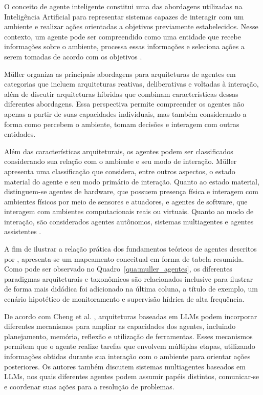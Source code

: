 O conceito de agente inteligente constitui uma das abordagens utilizadas na Inteligência Artificial para representar sistemas capazes de interagir com um ambiente e realizar ações orientadas a objetivos previamente estabelecidos. Nesse contexto, um agente pode ser compreendido como uma entidade que recebe informações sobre o ambiente, processa essas
informações e seleciona ações a serem tomadas de acordo com os objetivos \cite{muller1999}.

Müller \cite{muller1999} organiza as principais abordagens para arquiteturas de
agentes em categorias que incluem arquiteturas reativas, deliberativas e
voltadas à interação, além de discutir arquiteturas híbridas que combinam
características dessas diferentes abordagens. Essa perspectiva permite
compreender os agentes não apenas a partir de suas capacidades individuais,
mas também considerando a forma como percebem o ambiente, tomam decisões e
interagem com outras entidades.

Além das características arquiteturais, os agentes podem ser classificados
considerando sua relação com o ambiente e seu modo de interação. Müller
\cite{muller1999} apresenta uma classificação que considera, entre outros
aspectos, o estado material do agente e seu modo primário de interação.
Quanto ao estado material, distinguem-se agentes de hardware, que possuem
presença física e interagem com ambientes físicos por meio de sensores e
atuadores, e agentes de software, que interagem com ambientes computacionais
reais ou virtuais. Quanto ao modo de interação, são considerados agentes
autônomos, sistemas multiagentes e agentes assistentes
\cite{muller1999}.

A fim de ilustrar a relação prática dos fundamentos teóricos de agentes descritos por , apresenta-se um mapeamento conceitual em forma de tabela resumida. Como pode ser observado no Quadro~\ref{qua:muller_agentes}, os diferentes paradigmas arquiteturais e taxonômicos são relacionados inclusive para ilustrar de forma mais didádica foi adicionado na última coluna, a título de exemplo, um cenário hipotético de monitoramento e supervisão hídrica de alta frequência.



De acordo com Cheng et al. \cite{cheng2026}, arquiteturas baseadas em LLMs
podem incorporar diferentes mecanismos para ampliar as capacidades dos
agentes, incluindo planejamento, memória, reflexão e utilização de
ferramentas. Esses mecanismos permitem que o agente realize tarefas que
envolvem múltiplas etapas, utilizando informações obtidas durante sua
interação com o ambiente para orientar ações posteriores. Os autores também
discutem sistemas multiagentes baseados em LLMs, nos quais diferentes agentes
podem assumir papéis distintos, comunicar-se e coordenar suas ações para a
resolução de problemas.

